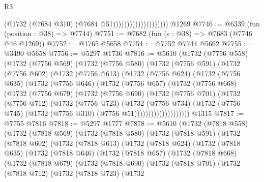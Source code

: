 \begin{lexlean}{R3}
\begin{coremodule}
                                        (@1732 (@7684 @310) (@7684 @51))))))))))))))))))))
    @1269
@7746 := @6339 (fun (position : @38) => @7744)
@7751 := @7682 (fun (s : @38) => @7683 (@7746 @46 @1269))
@7752 := @1765 @5658
@7754 := @7752 @7744 @5662
@7755 := @3490 @5658
@7756 := @5297 @1736
@7816 := @5610
    (@1732
      (@7756 @558)
      (@1732
        (@7756 @569)
        (@1732
          (@7756 @580)
          (@1732
            (@7756 @591)
            (@1732
              (@7756 @602)
              (@1732
                (@7756 @613)
                (@1732
                  (@7756 @624)
                  (@1732
                    (@7756 @635)
                    (@1732
                      (@7756 @646)
                      (@1732
                        (@7756 @657)
                        (@1732
                          (@7756 @668)
                          (@1732
                            (@7756 @679)
                            (@1732
                              (@7756 @690)
                              (@1732
                                (@7756 @701)
                                (@1732
                                  (@7756 @712)
                                  (@1732
                                    (@7756 @723)
                                    (@1732
                                      (@7756 @734)
                                      (@1732
                                        (@7756 @745)
                                        (@1732 (@7756 @310) (@7756 @51))))))))))))))))))))
    @1315
@7817 := @7755 @7816
@7818 := @5297 @1777
@7878 := @5610
    (@1732
      (@7818 @558)
      (@1732
        (@7818 @569)
        (@1732
          (@7818 @580)
          (@1732
            (@7818 @591)
            (@1732
              (@7818 @602)
              (@1732
                (@7818 @613)
                (@1732
                  (@7818 @624)
                  (@1732
                    (@7818 @635)
                    (@1732
                      (@7818 @646)
                      (@1732
                        (@7818 @657)
                        (@1732
                          (@7818 @668)
                          (@1732
                            (@7818 @679)
                            (@1732
                              (@7818 @690)
                              (@1732
                                (@7818 @701)
                                (@1732
                                  (@7818 @712)
                                  (@1732
                                    (@7818 @723)
                                    (@1732

\end{coremodule}
\end{lexlean}
